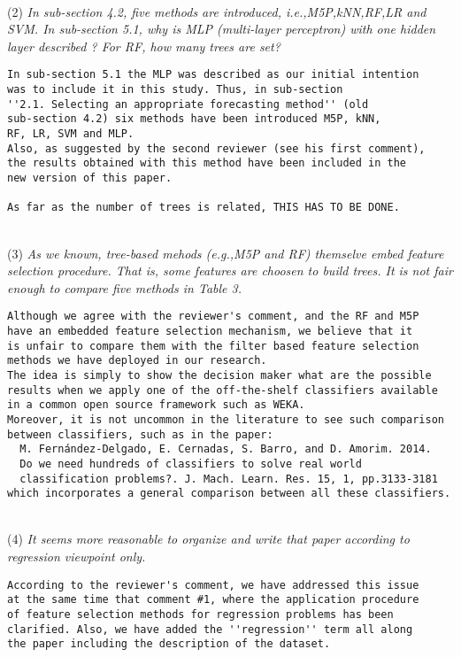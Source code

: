 \documentclass[preprint]{elsarticle}
\begin{document}
~\\
\noindent (2) \emph{In sub-section 4.2, five methods are introduced, i.e.,M5P,kNN,RF,LR and SVM. In sub-section 5.1, why is MLP (multi-layer perceptron) with one hidden layer described ? For RF, how many trees are set? } 

\begin{verbatim}
In sub-section 5.1 the MLP was described as our initial intention 
was to include it in this study. Thus, in sub-section 
''2.1. Selecting an appropriate forecasting method'' (old 
sub-section 4.2) six methods have been introduced M5P, kNN, 
RF, LR, SVM and MLP.
Also, as suggested by the second reviewer (see his first comment), 
the results obtained with this method have been included in the 
new version of this paper.

As far as the number of trees is related, THIS HAS TO BE DONE.
\end{verbatim}

~\\
\noindent (3) \emph{As we known, tree-based mehods (e.g.,M5P and RF) themselve embed feature selection procedure. That is, some features are choosen to build trees. It is not fair enough to compare five methods in Table 3. } 

\begin{verbatim}
Although we agree with the reviewer's comment, and the RF and M5P 
have an embedded feature selection mechanism, we believe that it 
is unfair to compare them with the filter based feature selection 
methods we have deployed in our research. 
The idea is simply to show the decision maker what are the possible 
results when we apply one of the off-the-shelf classifiers available 
in a common open source framework such as WEKA. 
Moreover, it is not uncommon in the literature to see such comparison 
between classifiers, such as in the paper:
  M. Fernández-Delgado, E. Cernadas, S. Barro, and D. Amorim. 2014. 
  Do we need hundreds of classifiers to solve real world 
  classification problems?. J. Mach. Learn. Res. 15, 1, pp.3133-3181
which incorporates a general comparison between all these classifiers.
\end{verbatim}

~\\
\noindent (4) \emph{It seems more reasonable to organize and write that paper according to regression viewpoint only. } 

\begin{verbatim}
According to the reviewer's comment, we have addressed this issue
at the same time that comment #1, where the application procedure 
of feature selection methods for regression problems has been 
clarified. Also, we have added the ''regression'' term all along 
the paper including the description of the dataset.
\end{verbatim}
\end{document}
